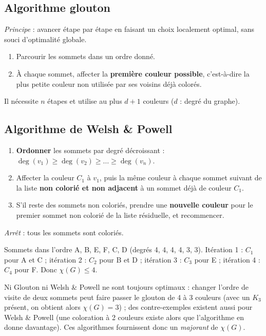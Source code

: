 \documentclass[11pt,a4paper]{article}
\begin{document}
\subsection{Algorithme glouton}
\begin{algo}[Glouton]
\emph{Principe} : avancer étape par étape en faisant un choix localement optimal, sans souci d'optimalité globale.
\begin{enumerate}[nosep]
\item Parcourir les sommets dans un ordre donné.
\item À chaque sommet, affecter la \textbf{première couleur possible}, c'est-à-dire la plus petite couleur non utilisée par ses voisins déjà colorés.
\end{enumerate}
Il nécessite $n$ étapes et utilise au plus $d+1$ couleurs ($d$ : degré du graphe).
\end{algo}

\subsection{Algorithme de Welsh \& Powell}
\begin{algo}
\begin{enumerate}[nosep]
\item \textbf{Ordonner} les sommets par degré décroissant : $\deg(v_1)\ge\deg(v_2)\ge\dots\ge\deg(v_n)$.
\item Affecter la couleur $C_1$ à $v_1$, puis la même couleur à chaque sommet suivant de la liste \textbf{non colorié et non adjacent} à un sommet déjà de couleur $C_1$.
\item S'il reste des sommets non coloriés, prendre une \textbf{nouvelle couleur} pour le premier sommet non colorié de la liste résiduelle, et recommencer.
\end{enumerate}
\emph{Arrêt} : tous les sommets sont coloriés.
\end{algo}

\begin{exemple}
Sommets dans l'ordre A, B, E, F, C, D (degrés 4, 4, 4, 4, 3, 3). Itération 1 : $C_1$ pour A et C ; itération 2 : $C_2$ pour B et D ; itération 3 : $C_3$ pour E ; itération 4 : $C_4$ pour F. Donc $\chi(G)\le4$.
\end{exemple}

\begin{remarque}
Ni Glouton ni Welsh \& Powell ne sont toujours optimaux : changer l'ordre de visite de deux sommets peut faire passer le glouton de 4 à 3 couleurs (avec un $K_3$ présent, on obtient alors $\chi(G)=3$) ; des contre-exemples existent aussi pour Welsh \& Powell (une coloration à 2 couleurs existe alors que l'algorithme en donne davantage). Ces algorithmes fournissent donc un \emph{majorant} de $\chi(G)$.
\end{remarque}
\end{document}
